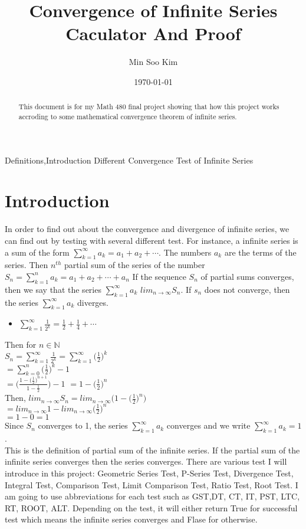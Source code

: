 \documentclass[12pt]{article}
\title{Convergence of Infinite Series Caculator And Proof}
\author{Min Soo Kim}
\date{\today}
\begin{document}
\maketitle
\tableofcontents{}
\newpage
Definitions,Introduction Different Convergence Test of Infinite Series
\begin{abstract}
This document is for my Math 480 final project showing that how this project works accroding to some mathematical convergence theorem of infinite series.
\end{abstract}
\section{Introduction}
In order to find out about the convergence and divergence of infinite series, we can find out by testing with several different test. For instance, a infinite series is a sum of the form $\displaystyle\sum_{k=1}^{\infty}a_k=a_1+a_2+\cdots$. The numbers $a_k$ are the terms of the series. Then $n^{th}$ partial sum of the series of the number
$S_n=\displaystyle\sum_{k=1}^{n}a_k=a_1+a_2+\cdots+a_n$\newline
If the sequence ${S_n}$ of partial sums converges, then we say that the series $\displaystyle\sum_{k=1}^{\infty}a_k$ $lim_{n\to\infty}S_n$.
If ${s_n}$ does not converge, then the series $\displaystyle\sum_{k=1}^{\infty}a_k$ diverges.
\begin{itemize}
\item $\displaystyle\sum_{k=1}^{\infty}\frac{1}{2^k}=\frac{1}{2}+\frac{1}{4}+\cdots$
\end{itemize}
Then for $n\in \mathbb{N}$ \\
$S_n=\displaystyle\sum_{k=1}^{\infty}\frac{1}{2^k}=\displaystyle\sum_{k=1}^{\infty}\big(\frac{1}{2}\big)^k$\\
$=\displaystyle\sum_{k=0}^{n}\big(\frac{1}{2}\big)^k-1$\\
$=\big(\frac{1-(\frac{1}{2}\big)^{n+1}}{1-\frac{1}{2}}\big)-1$\newline
$=1-\big(\frac{1}{2}\big)^n$\\
Then, $lim_{n\to\infty}S_n=lim_{n\to\infty}\big(1-\big(\frac{1}{2}\big)^n\big)$\\
$=lim_{n\to\infty}1-lim_{n\to\infty}\big(\frac{1}{2}\big)^n$\\
$=1-0=1$\\
Since ${S_n}$ converges to 1, the series $\displaystyle\sum_{k=1}^{\infty}a_k$ converges and we write $\displaystyle\sum_{k=1}^{\infty}a_k=1$.\\
This is the definition of partial sum of the infinite series. If the partial sum of the infinite series converges then the series converges. There are various test I will introduce in this project: Geometric Series Test, P-Series Test, Divergence Test, Integral Test, Comparison Test, Limit Comparison Test, Ratio Test, Root Test. I am going to use abbreviations for each test such as GST,DT, CT, IT, PST, LTC, RT, ROOT, ALT. Depending on the test, it will either return True for successful test which means the infinite series converges and Flase for otherwise. 
\end{document}
